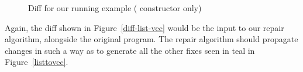 \begin{figure*}[!htp]
  \caption{Diff for our running example ( constructor only)}
  \label{diff-list-vec-cons}

\end{figure*}

Again, the diff shown in Figure~\ref{diff-list-vec} would be the input to our
repair algorithm, alongside the original program.  The repair algorithm should
propagate changes in such a way as to generate all the other fixes seen in teal
in Figure~\ref{listtovec}.

